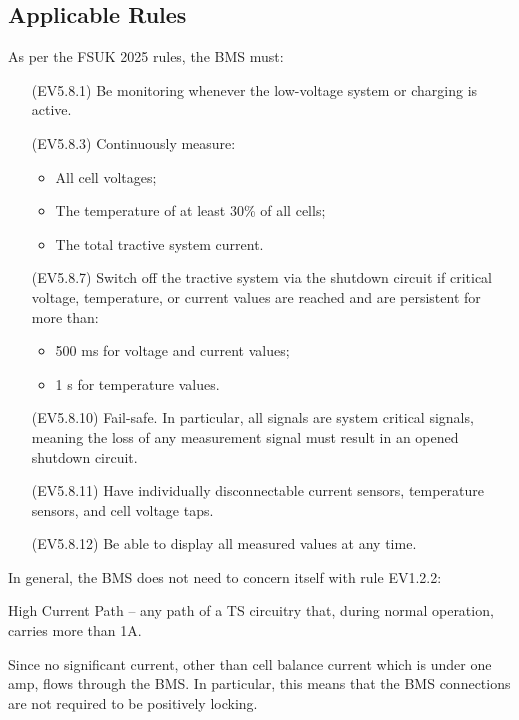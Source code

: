 \documentclass[12pt]{article}
\begin{document}
\subsection{Applicable Rules}
As per the FSUK 2025 rules, the BMS must:
\begin{itemize}
\item[(EV5.8.1)] Be monitoring whenever the low-voltage system or charging is active.
\item[(EV5.8.3)] Continuously measure:
  \begin{itemize}
  \item All cell voltages;
  \item The temperature of at least 30\% of all cells;
  \item The total tractive system current.
  \end{itemize}
\item[(EV5.8.7)] Switch off the tractive system via the shutdown circuit if critical voltage, temperature, or current values are reached and are persistent for more than:
  \begin{itemize}
  \item 500 ms for voltage and current values;
  \item 1 s for temperature values.
  \end{itemize}
\item[(EV5.8.10)] Fail-safe.
  In particular, all signals are system critical signals, meaning the loss of any measurement signal must result in an opened shutdown circuit.
\item[(EV5.8.11)] Have individually disconnectable current sensors, temperature sensors, and cell voltage taps.
\item[(EV5.8.12)] Be able to display all measured values at any time.
\end{itemize}

In general, the BMS does not need to concern itself with rule EV1.2.2:
\begin{displayquote}
  High Current Path -- any path of a TS circuitry that, during normal operation, carries more than 1A.
\end{displayquote}
Since no significant current, other than cell balance current which is under one amp, flows through the BMS.
In particular, this means that the BMS connections are not required to be positively locking.
\end{document}
